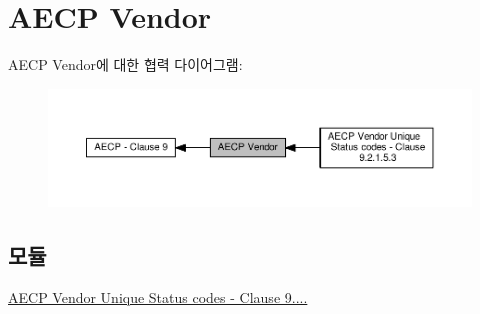 \hypertarget{group__aecp__vendor}{}\section{A\+E\+CP Vendor}
\label{group__aecp__vendor}
A\+E\+CP Vendor에 대한 협력 다이어그램\+:
\nopagebreak
\begin{figure}[H]
\begin{center}
\leavevmode
\includegraphics[width=350pt]{group__aecp__vendor}
\end{center}
\end{figure}
\subsection*{모듈}
\begin{DoxyCompactItemize}
\item 
\hyperlink{group__aecp__vendor__status}{A\+E\+C\+P Vendor Unique Status codes -\/ Clause 9....}
\end{DoxyCompactItemize}
